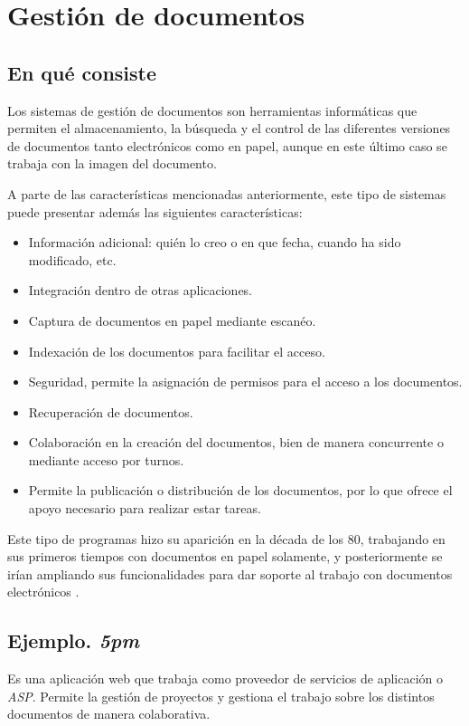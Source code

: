 \documentclass[11pt,a4paper,spanish,twoside]{report}
\begin{document}
\chapter{Gestión de documentos}
\section{En qué consiste}

Los sistemas de gestión de documentos son herramientas informáticas que
permiten el almacenamiento, la búsqueda y el control de las diferentes
versiones de documentos tanto electrónicos como en papel, aunque en este
último caso se trabaja con la imagen del documento. 

A parte de las características mencionadas anteriormente, este tipo de
sistemas puede presentar además las siguientes características:
\begin{itemize}
    \item Información adicional: quién lo creo o en que fecha, cuando ha sido
    modificado, etc. 
    \item Integración dentro de otras aplicaciones.
    \item Captura de documentos en papel mediante escanéo.
    \item Indexación de los documentos para facilitar el acceso.
    \item Seguridad, permite la asignación de permisos para el acceso a los
      documentos.
    \item Recuperación de documentos.
    \item Colaboración en la creación del documentos, bien de manera
      concurrente o mediante acceso por turnos.
    \item Permite la publicación o distribución de los documentos, por lo que
      ofrece el apoyo necesario para realizar estar tareas.
\end{itemize}

Este tipo de programas hizo su aparición en la década de los 80, trabajando
en sus primeros tiempos con documentos en papel solamente, y posteriormente
se irían ampliando sus funcionalidades para dar soporte al trabajo con
documentos electrónicos \cite{DMS}.

\section{Ejemplo. \emph{5pm}}

Es una aplicación web que trabaja como proveedor de servicios de aplicación o
\emph{ASP}. Permite la gestión de proyectos y gestiona el trabajo sobre los
distintos documentos de manera colaborativa.
\end{document}
